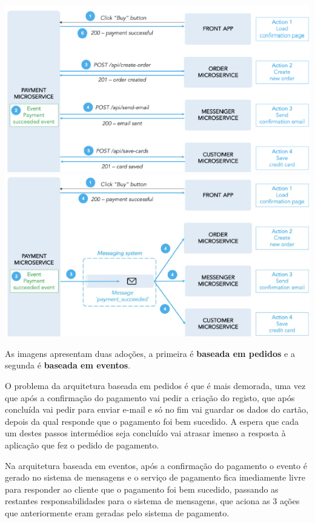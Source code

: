 \documentclass{article}
\begin{document}
\begin{center}
  \includegraphics[scale=0.5]{106}
  \includegraphics[scale=0.5]{107}
\end{center}

As imagens apresentam duas adoções, a primeira é
\textbf{baseada em pedidos} e a segunda é \textbf{baseada em eventos}.

\vspace{2mm}

O problema da arquitetura baseada em pedidos é que é mais demorada, uma vez que após a confirmação do
pagamento vai pedir a criação do registo, que após concluída vai pedir para enviar e-mail e só no fim vai guardar os
dados do cartão, depois da qual responde que o pagamento foi bem sucedido. A espera que cada um destes passos
intermédios seja concluído vai atrasar imenso a resposta à aplicação que fez o pedido de pagamento.

\pagebreak

Na arquitetura baseada em eventos, após a confirmação do pagamento o evento é gerado no sistema de mensagens e
o serviço de pagamento fica imediamente livre para responder ao cliente que o pagamento foi bem sucedido,
passando as restantes responsabilidades para o sistema de mensagens, que aciona as 3 ações que anteriormente
eram geradas pelo sistema de pagamento.
\end{document}
